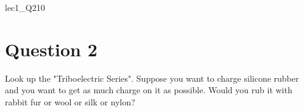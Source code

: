 \documentclass[12pt]{article}
\begin{document}
\begin{edXproblem}{lec1_Q2}{10}

\section{Question 2}

Look up the "Triboelectric Series". Suppose you want to charge
silicone rubber and you want to get as much charge on it as
possible. Would you rub it with rabbit fur or wool or silk or nylon?



\end{edXproblem}

\end{document}
